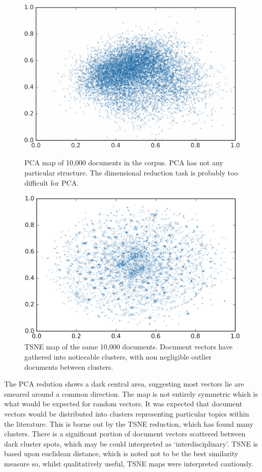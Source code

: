 \begin{figure}[H]
  \centering
  \begin{minipage}[b]{0.49\textwidth}
    \includegraphics[width=\textwidth]{Validation/pca2.png}
    \caption{PCA map of 10,000 documents in the corpus. PCA has not any particular structure. The dimensional reduction task is probably too difficult for PCA.}
  \end{minipage}
  \hfill
  \begin{minipage}[b]{0.49\textwidth}
    \includegraphics[width=\textwidth]{Validation/tsne2.png}
    \caption{TSNE map of the same 10,000 documents. Document vectors have gathered into noticeable clusters, with non negligible outlier documents between clusters. }
  \end{minipage}
\end{figure}
The PCA redution shows a dark central area, suggesting most vectors lie are smeared around a common direction. The map is not entirely symmetric which is what would be expected for random vectors. It was expected that document vectors would be distributed into clusters representing particular topics within the literature. This is borne out by the TSNE reduction, which has found many clusters. There is a significant portion of document vectors scattered between dark cluster spots, which may be could interpreted as `interdisciplinary'.
TSNE is based upon euclidean distance, which is noted not to be the best similarity measure so, whilst qualitatively useful, TSNE maps were interpreted cautiously.
